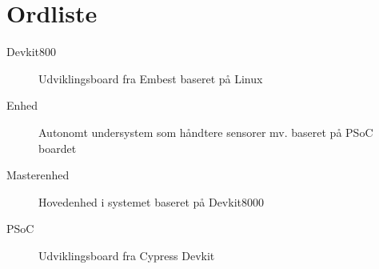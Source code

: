 \chapter{Ordliste}


\begin{description}

\item[Devkit800] Udviklingsboard fra Embest baseret på Linux
\item[Enhed] Autonomt undersystem som håndtere sensorer mv. baseret på PSoC boardet
\item[Masterenhed] Hovedenhed i systemet baseret på Devkit8000
\item[PSoC] Udviklingsboard fra Cypress
Devkit

\end{description}
